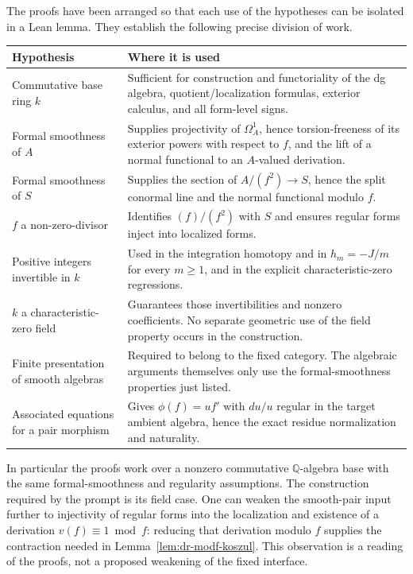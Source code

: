 \documentclass[11pt]{article}
\theoremstyle{definition}
\theoremstyle{remark}
\newcommand{\Om}{\Omega}
\begin{document}
The proofs have been arranged so that each use of the hypotheses can be isolated in a Lean lemma. They establish the following precise division of work.
{\small
\begin{longtable}{@{}p{}p{}@{}}
\toprule
Hypothesis & Where it is used\\\midrule\endhead
Commutative base ring $k$ & Sufficient for construction and functoriality of the dg algebra, quotient/localization formulas, exterior calculus, and all form-level signs.\\
Formal smoothness of $A$ & Supplies projectivity of $\Om_A^1$, hence torsion-freeness of its exterior powers with respect to $f$, and the lift of a normal functional to an $A$-valued derivation.\\
Formal smoothness of $S$ & Supplies the section of $A/(f^2)\to S$, hence the split conormal line and the normal functional modulo $f$.\\
$f$ a non-zero-divisor & Identifies $(f)/(f^2)$ with $S$ and ensures regular forms inject into localized forms.\\
Positive integers invertible in $k$ & Used in the integration homotopy and in $h_m=-J/m$ for every $m\geq1$, and in the explicit characteristic-zero regressions.\\
$k$ a characteristic-zero field & Guarantees those invertibilities and nonzero coefficients. No separate geometric use of the field property occurs in the construction.\\
Finite presentation of smooth algebras & Required to belong to the fixed category. The algebraic arguments themselves only use the formal-smoothness properties just listed.\\
Associated equations for a pair morphism & Gives $\phi(f)=u f'$ with $du/u$ regular in the target ambient algebra, hence the exact residue normalization and naturality.\\
\bottomrule
\end{longtable}
}
In particular the proofs work over a nonzero commutative $\mathbb Q$-algebra base with the same formal-smoothness and regularity assumptions. The construction required by the prompt is its field case. One can weaken the smooth-pair input further to injectivity of regular forms into the localization and existence of a derivation $v(f)\equiv1\bmod f$: reducing that derivation modulo $f$ supplies the contraction needed in Lemma~\ref{lem:dr-modf-koszul}. This observation is a reading of the proofs, not a proposed weakening of the fixed interface.
\end{document}

